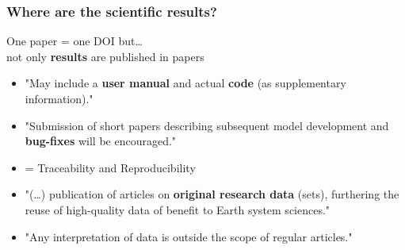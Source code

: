 \begin{frame}[c]
\frametitle{Where are the scientific results?}

One paper = one DOI but\ldots \\
not only \textbf{results} are published in papers

\vspace{1cm}


\begin{itemize}
\footnotesize
\item<3-> "May include a \textbf{user manual} and actual \textbf{code} (as supplementary information)."

\item<4-> "Submission of short papers describing subsequent model development and \textbf{bug-fixes} will be encouraged."

\item<5->[]= Traceability and Reproducibility

\end{itemize}



\begin{itemize}
\footnotesize
\item<7-> "(\ldots) publication of articles on \textbf{original research data} (sets), furthering the reuse of high-quality data of benefit to Earth system sciences."

\item<8-> "Any interpretation of data is outside the scope of regular articles."


\end{itemize}

\end{frame}

